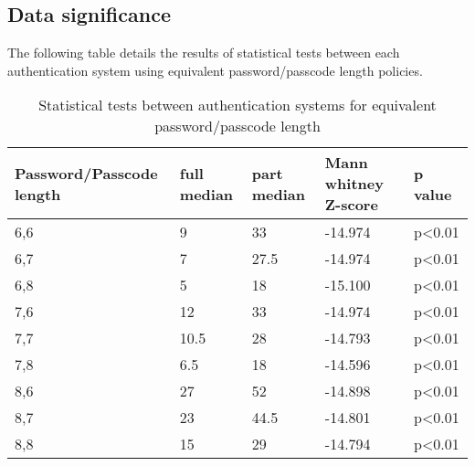 \documentclass[british,10pt,a4paper]{article}
\begin{document}
\begin{appendices}
  	\subsection{Data significance}
  	\label{app:significant_stats}
  	The following table details the results of statistical tests between each authentication system using equivalent password/passcode length policies.
  	\begin{table}[h]
	\centering
	\begin{tabular}{|l|l|l|l|l|}
	\hline
	\textbf{Password/Passcode length} & \textbf{full median} & \textbf{part median} & \textbf{Mann whitney Z-score} & \textbf{p value} \\ \hline
	6,6 & 9 & 33 & -14.974 & p\textless0.01 \\ \hline
	6,7 & 7 & 27.5 & -14.974 & p\textless0.01 \\ \hline
	6,8 & 5 & 18 & -15.100 & p\textless0.01 \\ \hline
	7,6 & 12 & 33 & -14.974 & p\textless0.01 \\ \hline
	7,7 & 10.5 & 28 & -14.793 & p\textless0.01 \\ \hline
	7,8 & 6.5 & 18 & -14.596 & p\textless0.01 \\ \hline
	8,6 & 27 & 52 & -14.898 & p\textless0.01 \\ \hline
	8,7 & 23 & 44.5 & -14.801 & p\textless0.01 \\ \hline
	8,8 & 15 & 29 & -14.794 & p\textless0.01 \\ \hline
	\end{tabular}
	\caption{Statistical tests between authentication systems for equivalent password/passcode length}
	\label{tab:significance}
	\end{table}


\end{appendices}
\end{document}
